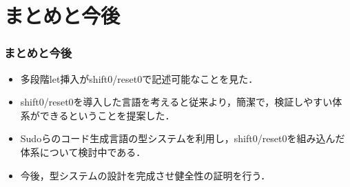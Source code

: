 \documentclass[dvipdfmx,cjk,xcolor=dvipsnames,envcountsect,notheorems,12pt]{beamer}
\theoremstyle{definition}
\begin{document}







\section{まとめと今後}

\begin{frame}
  \frametitle{まとめと今後}
  \begin{itemize}
  \item 多段階let挿入がshift0/reset0で記述可能なことを見た．
  \item[] shift0/reset0を導入した言語を考えると従来より，簡潔で，検証しやすい体系ができるということを提案した．
  \item Sudoらのコード生成言語の型システムを利用し，shift0/reset0を組み込んだ体系について検討中である．
  \item 今後，型システムの設計を完成させ健全性の証明を行う．%
  \end{itemize}
\end{frame}


\end{document}
